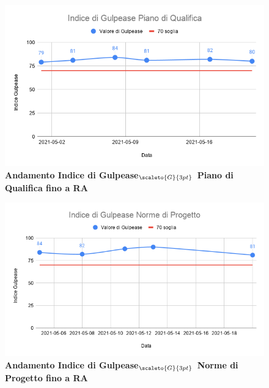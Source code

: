 {{{{{{{{{{{{{{{{{{{{{	\begin{figure}[H]
		\begin{center}
			\includegraphics[width=0.8\linewidth]{../immagini/gulpeaseRA/Indice_di_Gulpease_Piano_di_Qualifica.png}
			\caption{\textbf{Andamento Indice di Gulpease$_{\scaleto{G}{3pt}}$ Piano di Qualifica fino a RA}}
		\end{center}
	\end{figure}
	\begin{figure}[H]
		\begin{center}
			\includegraphics[width=0.8\linewidth]{../immagini/gulpeaseRA/Indice_di_Gulpease_Norme_di_Progetto.png}
			\caption{\textbf{Andamento Indice di Gulpease$_{\scaleto{G}{3pt}}$ Norme di Progetto fino a RA}}
		\end{center}
	\end{figure}
	
}}}}}}}}}}}}}}}}}}}}}
